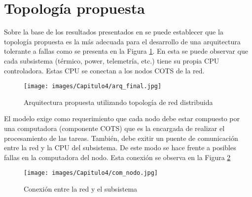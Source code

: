 \section{Topología propuesta}
Sobre la base de los resultados presentados en \citep{Arias17} se puede establecer que la topología propuesta es la más adecuada para el desarrollo de una arquitectura tolerante a fallas como se presenta en la Figura \ref{fig:topo_propuesta}. En esta se puede observar que cada subsistema (térmico, power, telemetría, etc.) tiene su propia CPU controladora. Estas CPU se conectan a los nodos COTS de la red.

\begin{figure}[h!]
 \centering
 \texttt{[image: images/Capitulo4/arq\_final.jpg]}
  \caption{Arquitectura propuesta utilizando topología de red distribuida}
\label{fig:topo_propuesta}
\end{figure}

El modelo exige como requerimiento que cada nodo debe estar compuesto por una computadora (componente COTS) que es la encargada de realizar el procesamiento de las tareas. También, debe exitir un puente de comunicación entre la red y la CPU del subsistema. De este modo se hace frente a posibles fallas en la computadora del nodo. Esta conexión se observa en la Figura \ref{fig:conn_prop}

\begin{figure}[h!]
 \centering
 \texttt{[image: images/Capitulo4/com\_nodo.jpg]}
 \caption{Conexión entre la red y el subsistema}
\label{fig:conn_prop}
\end{figure}
